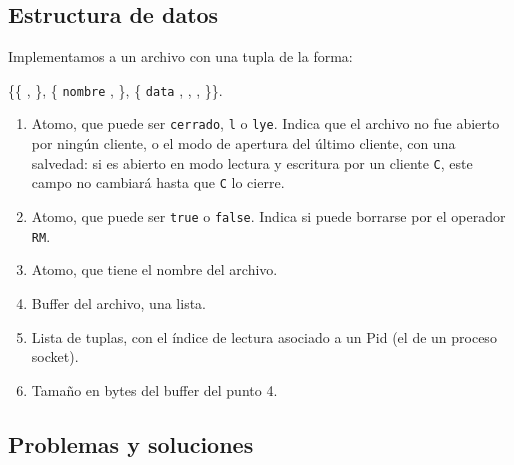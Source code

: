 \documentclass[a4paper, 8pt]{article}
\begin{document}
  
\subsection{Estructura de datos}

  Implementamos a un archivo con una tupla de la forma:

\vspace{2.5mm}

\{\{  ,  \}, \{ \texttt{nombre} ,  \}, \{ \texttt{data} ,  ,  ,  \}\}.

\vspace{2.5mm}

\begin{enumerate}
  \item Atomo, que puede ser \texttt{cerrado}, \texttt{l} o \texttt{lye}. Indica que el archivo no fue abierto por ningún cliente, o el modo de apertura del último cliente,
  con una salvedad:  si es abierto en modo lectura y escritura por un cliente \texttt{C}, este campo no cambiará hasta que \texttt{C} lo cierre.
  \item Atomo, que puede ser \texttt{true} o \texttt{false}. Indica si puede borrarse por el operador \texttt{RM}.
  \item Atomo, que tiene el nombre del archivo.
  \item Buffer del archivo, una lista.
  \item Lista de tuplas, con el índice de lectura asociado a un Pid (el de un proceso socket).
  \item Tamaño en bytes del buffer del punto 4.
\end{enumerate}

\subsection{Problemas y soluciones}
\end{document}

